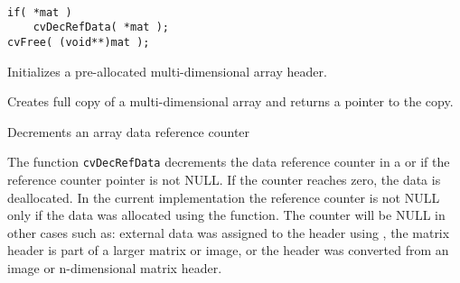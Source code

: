 \begin{lstlisting}

if( *mat )
    cvDecRefData( *mat );
cvFree( (void**)mat );

\end{lstlisting}

\label{InitMatNDHeader}

Initializes a pre-allocated multi-dimensional array header.


\begin{description}
\end{description}

\label{CloneMatND}

Creates full copy of a multi-dimensional array and returns a pointer to the copy.


\begin{description}
\end{description}


\label{DecRefData}

Decrements an array data reference counter


\begin{description}
\end{description}

The function \texttt{cvDecRefData} decrements the data reference counter in a  or
 if the reference counter pointer
is not NULL. If the counter reaches zero, the data is deallocated. In the
current implementation the reference counter is not NULL only if the data
was allocated using the  function. The counter will be NULL in other cases such as:
external data was assigned to the header using , the matrix
header is part of a larger matrix or image, or the header was converted from an image or n-dimensional matrix header. 



